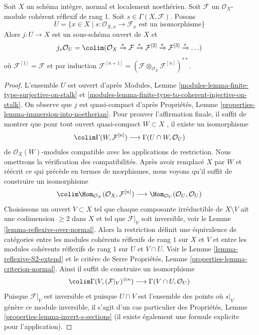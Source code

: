 \begin{lemma}
\label{lemma-structure-sheaf-Xs}
Soit  $X$  un schéma intègre, normal et localement noethérien. Soit
 $\mathcal{F}$  un  $\mathcal{O}_X$-module cohérent réflexif de rang 1. Soit
 $s \in \Gamma(X, \mathcal{F})$. Posons
$$
U = \{x \in X \mid s : \mathcal{O}_{X, x} \to \mathcal{F}_x
\text{ est un isomorphisme}\}
$$
Alors  $j : U \to X$  est un sous-schéma ouvert de  $X$  et
$$
j_*\mathcal{O}_U =
\colim (\mathcal{O}_X \xrightarrow{s} \mathcal{F}
\xrightarrow{s} \mathcal{F}^{[2]}
\xrightarrow{s} \mathcal{F}^{[3]}
\xrightarrow{s} \ldots)
$$
où  $\mathcal{F}^{[1]} = \mathcal{F}$  et par induction  $\mathcal{F}^{[n + 1]} =
(\mathcal{F} \otimes_{\mathcal{O}_X} \mathcal{F}^{[n]})^{**}$.
\end{lemma}

\begin{proof}
L'ensemble  $U$  est ouvert d'après Modules, Lemme  \ref{modules-lemma-finite-type-surjective-on-stalk}  et
 \ref{modules-lemma-finite-type-to-coherent-injective-on-stalk}. On observe que  $j$  est quasi-compact d'après Propriétés,
Lemme  \ref{properties-lemma-immersion-into-noetherian}. Pour prouver l'affirmation finale, il suffit de montrer que
pour tout ouvert quasi-compact  $W \subset X$ , il existe un isomorphisme
$$
\colim \Gamma(W, \mathcal{F}^{[n]})
\longrightarrow
\Gamma(U \cap W, \mathcal{O}_U)
$$
de  $\mathcal{O}_X(W)$-modules compatible avec les applications de restriction. Nous
omettrons la vérification des compatibilités. Après avoir remplacé  $X$ 
par  $W$  et réécrit ce qui précède en termes de morphismes, nous voyons qu'il
suffit de construire un isomorphisme
$$
\colim \Hom_{\mathcal{O}_X}(\mathcal{O}_X, \mathcal{F}^{[n]})
\longrightarrow
\Hom_{\mathcal{O}_U}(\mathcal{O}_U, \mathcal{O}_U)
$$
Choisissons un ouvert  $V \subset X$  tel que chaque composante irréductible de
 $X \setminus V$  ait une codimension  $\geq 2$  dans  $X$  et tel que
 $\mathcal{F}|_V$  soit inversible, voir le Lemme  \ref{lemma-reflexive-over-normal}. Alors la restriction
définit une équivalence de catégories entre les modules cohérents
réflexifs de rang  $1$  sur  $X$  et  $V$  et entre les
modules cohérents réflexifs de rang  $1$  sur  $U$  et  $V \cap U$.
Voir le Lemme  \ref{lemma-reflexive-S2-extend}  et le critère de Serre Propriétés, Lemme  \ref{properties-lemma-criterion-normal}.
Ainsi il suffit de construire un isomorphisme
$$
\colim \Gamma(V, (\mathcal{F}|_V)^{\otimes n}) \longrightarrow
\Gamma(V \cap U, \mathcal{O}_U)
$$
Puisque  $\mathcal{F}|_V$  est inversible et puisque  $U \cap V$  est l'ensemble
des points où  $s|_V$  génère ce module inversible, il s'agit d'un cas
particulier des Propriétés, Lemme  \ref{properties-lemma-invert-s-sections}  (il existe également une formule
explicite pour l'application).
\end{proof}

